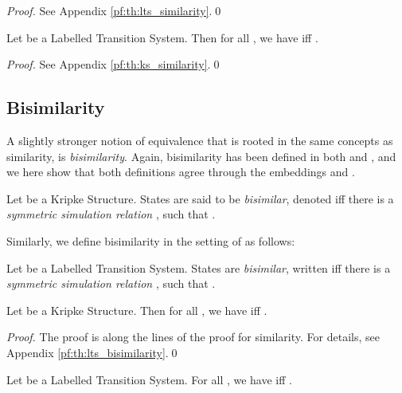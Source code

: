 \documentclass{llncs}
\begin{document}
\begin{proof}
See Appendix \ref{pf:th:lts_similarity}.\qed
\end{proof}

\begin{theorem}
\label{th:ks_similarity}
Let  be a Labelled Transition System.
Then for all , we have  iff
.
\end{theorem}

\begin{proof}
See Appendix \ref{pf:th:ks_similarity}.\qed
\end{proof}

\subsection{Bisimilarity}
\label{sec:bisimilarity}

A slightly stronger notion of equivalence that is rooted in the same concepts
as similarity, is \emph{bisimilarity}. Again, bisimilarity has been defined
in both \KS and \LTS, and we here show that both definitions agree through
the embeddings  and .

\begin{definition}
Let  be a Kripke Structure. States
 are said to be \emph{bisimilar}, denoted
 iff there is a \emph{symmetric
simulation relation} , such that .

\end{definition}
Similarly, we define bisimilarity in the setting of \LTS as follows:

\begin{definition}
Let  be a Labelled Transition System.
States  are \emph{bisimilar}, written  iff
there is a \emph{symmetric simulation relation} , such that
.

\end{definition}

\begin{theorem}
\label{th:lts_bisimilarity}
Let  be a Kripke Structure. Then for all
, we have  iff .
\end{theorem}

\begin{proof}
The proof is along the lines of the proof for similarity. For details,
see Appendix \ref{pf:th:lts_bisimilarity}.\qed
\end{proof}

\begin{theorem}
Let  be a Labelled Transition System.
For all , we have  iff .
\end{theorem}
\end{document}
